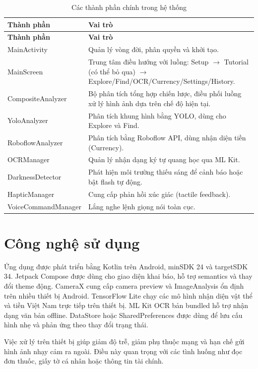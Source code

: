 \documentclass[a4paper,13pt]{report}
\begin{document}
\begin{longtable}{p{}p{}}
\caption{Các thành phần chính trong hệ thống}\\
\toprule
\textbf{Thành phần} & \textbf{Vai trò} \\
\midrule
\endfirsthead
\toprule
\textbf{Thành phần} & \textbf{Vai trò} \\
\midrule
\endhead
MainActivity & Quản lý vòng đời, phân quyền và khởi tạo. \\ \hline
MainScreen & Trung tâm điều hướng với luồng: Setup $\rightarrow$ Tutorial (có thể bỏ qua) $\rightarrow$ Explore/Find/OCR/Currency/Settings/History. \\ \hline
CompositeAnalyzer & Bộ phân tích tổng hợp chiến lược, điều phối luồng xử lý hình ảnh dựa trên chế độ hiện tại. \\ \hline
YoloAnalyzer & Phân tích khung hình bằng YOLO, dùng cho Explore và Find. \\ \hline
RoboflowAnalyzer & Phân tích bằng Roboflow API, dùng nhận diện tiền (Currency). \\ \hline
OCRManager & Quản lý nhận dạng ký tự quang học qua ML Kit. \\ \hline
DarknessDetector & Phát hiện môi trường thiếu sáng để cảnh báo hoặc bật flash tự động. \\ \hline
HapticManager & Cung cấp phản hồi xúc giác (tactile feedback). \\ \hline
VoiceCommandManager & Lắng nghe lệnh giọng nói toàn cục. \\
\bottomrule
\end{longtable}

\section{Công nghệ sử dụng}

Ứng dụng được phát triển bằng Kotlin trên Android, minSDK 24 và targetSDK 34. Jetpack Compose được dùng cho giao diện khai báo, hỗ trợ semantics và thay đổi theme động. CameraX cung cấp camera preview và ImageAnalysis ổn định trên nhiều thiết bị Android. TensorFlow Lite chạy các mô hình nhận diện vật thể và tiền Việt Nam trực tiếp trên thiết bị. ML Kit OCR bản bundled hỗ trợ nhận dạng văn bản offline. DataStore hoặc SharedPreferences được dùng để lưu cấu hình nhẹ và phản ứng theo thay đổi trạng thái.

Việc xử lý trên thiết bị giúp giảm độ trễ, giảm phụ thuộc mạng và hạn chế gửi hình ảnh nhạy cảm ra ngoài. Điều này quan trọng với các tình huống như đọc đơn thuốc, giấy tờ cá nhân hoặc thông tin tài chính.
\end{document}

